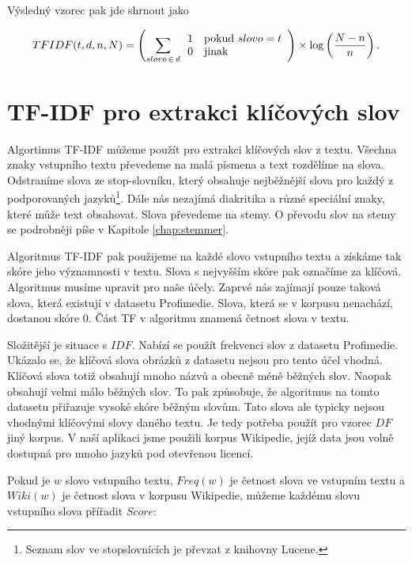 Výsledný vzorec pak jde shrnout jako

\begin{equation}
TFIDF(t,d,n,N)= \left(\sum_{slovo\,\in\,d} \begin{array}{l l} 1 & \mathrm{pokud}\ slovo = t \\
  0 & \mathrm{jinak} \end{array}\right)
  \times
  \log \left(\frac{N - n}{n}\right).
\end{equation}

\section{TF-IDF pro extrakci klíčových slov}
\label{sec:keywords_extraction}

Algortimus TF-IDF můžeme použít pro extrakci klíčových slov z textu. Všechna znaky vstupního textu převedeme na malá písmena a text rozdělíme na slova. Odstraníme slova ze stop-slovníku, který obsahuje nejběžnější slova pro každý z podporovaných jazyků\footnote{Seznam slov ve stopslovnících je převzat z knihovny Lucene.}. Dále nás nezajímá diakritika a různé speciální znaky, které může text obsahovat.  Slova převedeme na stemy. O převodu slov na stemy se podrobněji píše v Kapitole \ref{chap:stemmer}.

Algoritmus TF-IDF pak použijeme na každé slovo vstupního textu a získáme tak skóre jeho významnosti v textu. Slova s nejvyšším skóre pak označíme za klíčová. Algoritmus musíme upravit pro naše účely. Zaprvé nás zajímají pouze taková slova, která existují v datasetu Profimedie. Slova, která se v korpusu nenachází, dostanou skóre $0$. Část TF v algoritmu znamená četnost slova v textu.

Složitější je situace s $IDF$. Nabízí se použít frekvenci slov z datasetu Profimedie. Ukázalo se, že klíčová slova obrázků z datasetu nejsou pro tento účel vhodná. Klíčová slova totiž obsahují mnoho názvů a obecně méně běžných slov. Naopak obsahují velmi málo běžných slov. To pak způsobuje, že algoritmus na tomto datasetu přiřazuje vysoké skóre běžným slovům. Tato slova ale typicky nejsou vhodnými klíčovými slovy daného textu. Je tedy potřeba použít pro vzorec $DF$ jiný korpus. V naší aplikaci jsme použili korpus Wikipedie, jejíž data jsou volně dostupná pro mnoho jazyků pod otevřenou licencí.

Pokud je $w$ slovo vstupního textu, $Freq(w)$ je četnost slova ve vstupním textu a $Wiki(w)$ je četnost slova v korpusu Wikipedie, můžeme každému slovu vstupního slova přířadit $Score$:


